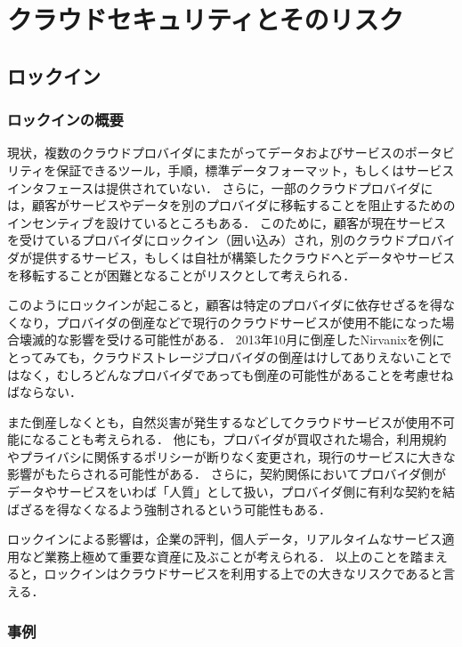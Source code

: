 \chapter{クラウドセキュリティとそのリスク}

\section{ロックイン}
\subsection{ロックインの概要}

現状，複数のクラウドプロバイダにまたがってデータおよびサービスのポータビリティを保証できるツール，手順，標準データフォーマット，もしくはサービスインタフェースは提供されていない．
さらに，一部のクラウドプロバイダには，顧客がサービスやデータを別のプロバイダに移転することを阻止するためのインセンティブを設けているところもある．
このために，顧客が現在サービスを受けているプロバイダにロックイン（囲い込み）され，別のクラウドプロバイダが提供するサービス，もしくは自社が構築したクラウドへとデータやサービスを移転することが困難となることがリスクとして考えられる．

このようにロックインが起こると，顧客は特定のプロバイダに依存せざるを得なくなり，プロバイダの倒産などで現行のクラウドサービスが使用不能になった場合壊滅的な影響を受ける可能性がある．
2013年10月に倒産したNirvanixを例にとってみても，クラウドストレージプロバイダの倒産はけしてありえないことではなく，むしろどんなプロバイダであっても倒産の可能性があることを考慮せねばならない．

また倒産しなくとも，自然災害が発生するなどしてクラウドサービスが使用不可能になることも考えられる．
他にも，プロバイダが買収された場合，利用規約やプライバシに関係するポリシーが断りなく変更され，現行のサービスに大きな影響がもたらされる可能性がある．
さらに，契約関係においてプロバイダ側がデータやサービスをいわば「人質」として扱い，プロバイダ側に有利な契約を結ばざるを得なくなるよう強制されるという可能性もある．

ロックインによる影響は，企業の評判，個人データ，リアルタイムなサービス適用など業務上極めて重要な資産に及ぶことが考えられる．
以上のことを踏まえると，ロックインはクラウドサービスを利用する上での大きなリスクであると言える．

\subsection{事例}

